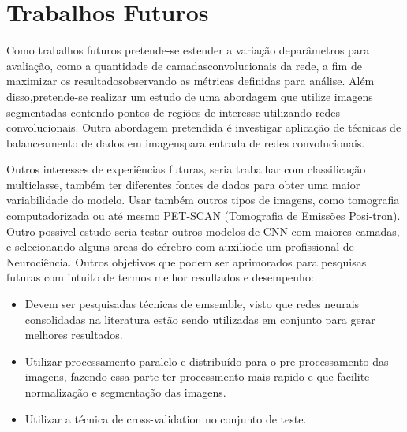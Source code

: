 \documentclass[openright]{UFRGS} %
\begin{document}
\chapter{Trabalhos Futuros}


Como trabalhos futuros pretende-se estender a variação deparâmetros para avaliação, como a quantidade de camadasconvolucionais da rede, a ﬁm de maximizar os resultadosobservando as métricas deﬁnidas para análise. Além disso,pretende-se realizar um estudo de uma abordagem que utilize imagens segmentadas contendo pontos de regiões de interesse utilizando redes convolucionais. Outra abordagem pretendida é investigar aplicação de técnicas de balanceamento de dados em imagenspara entrada de redes convolucionais.


Outros interesses de experiências futuras, seria trabalhar com classificação multiclasse, também ter  diferentes fontes de dados para obter uma maior variabilidade do modelo. Usar também outros tipos de imagens, como tomografia computadorizada ou até mesmo PET-SCAN (Tomografia de Emissões Posi-tron). Outro possivel estudo seria  testar outros modelos de CNN com maiores camadas, e selecionando
alguns areas do cérebro com auxiliode um profissional de Neurociência. Outros objetivos que podem ser aprimorados  para  pesquisas futuras com intuito  de termos melhor resultados e desempenho:

\begin{itemize}
 \item Devem ser pesquisadas técnicas de emsemble, visto que redes neurais consolidadas
na literatura estão sendo utilizadas em conjunto para gerar melhores resultados.

 \item Utilizar  processamento paralelo e distribuído para o pre-processamento das imagens, fazendo essa parte ter processmento mais
 rapido e que facilite normalização e segmentação das imagens.

\item Utilizar a técnica de cross-validation no conjunto de teste.

\end{itemize}









% 
\end{document}
